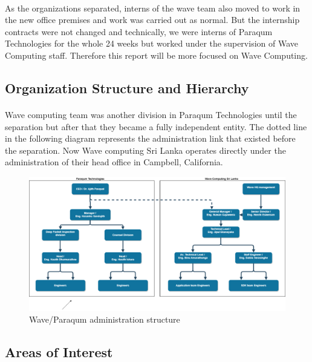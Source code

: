 \paragraph{}
As the organizations separated, interns of the wave team also moved to work in the new office premises and work was carried out as normal. But the internship contracts were not changed and technically, we were interns of Paraqum Technologies for the whole 24 weeks but worked under the supervision of Wave Computing staff. Therefore this report will be more focused on Wave Computing.

\subsection{Organization Structure and Hierarchy}

\paragraph{}
Wave computing team was another division in Paraqum Technologies until the separation but after that they became a fully independent entity. The dotted line in the following diagram represents the administration link that existed before the separation. Now Wave computing Sri Lanka operates directly under the administration of their head office in Campbell, California. 

\begin{figure}[h]
    \centering
    \includegraphics[trim=0cm 0cm 0cm 0cm, clip=true,scale=0.25]{figures/admin_struct.png}
    \caption{Wave/Paraqum administration structure \label{Fig:adminstruct}}\vspace{-4mm}
    \end{figure}

\subsection{Areas of Interest}

